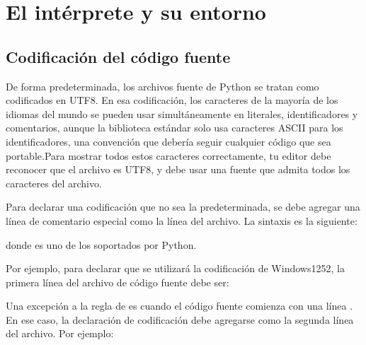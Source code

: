 \documentclass[a4,10pt,spanish]{sphinxmanual}
\begin{document}
\section{El intérprete y su entorno}
\label{\detokenize{tutorial/interpreter:the-interpreter-and-its-environment}}\label{\detokenize{tutorial/interpreter:tut-interp}}

\subsection{Codificación del código fuente}
\label{\detokenize{tutorial/interpreter:source-code-encoding}}\label{\detokenize{tutorial/interpreter:tut-source-encoding}}
\sphinxAtStartPar
De forma predeterminada, los archivos fuente de Python se tratan como codificados en UTF\sphinxhyphen{}8. En esa codificación, los caracteres de la mayoría de los idiomas del mundo se pueden usar simultáneamente en literales, identificadores y comentarios, aunque la biblioteca estándar solo usa caracteres ASCII para los identificadores, una convención que debería seguir cualquier código que sea portable.Para mostrar todos estos caracteres correctamente, tu editor debe reconocer que el archivo es UTF\sphinxhyphen{}8, y debe usar una fuente que admita todos los caracteres del archivo.

\sphinxAtStartPar
Para declarar una codificación que no sea la predeterminada, se debe agregar una línea de comentario especial como la  línea del archivo. La sintaxis es la siguiente:

\begin{sphinxVerbatim}[commandchars=\\\{\}]
\end{sphinxVerbatim}

\sphinxAtStartPar
donde  es uno de los  soportados por Python.

\sphinxAtStartPar
Por ejemplo, para declarar que se utilizará la codificación de Windows\sphinxhyphen{}1252, la primera línea del archivo de código fuente debe ser:

\begin{sphinxVerbatim}[commandchars=\\\{\}]
\end{sphinxVerbatim}

\sphinxAtStartPar
Una excepción a la regla de  es cuando el código fuente comienza con una línea {\hyperref[\detokenize{tutorial/appendix:tut-scripts}]{}}. En ese caso, la declaración de codificación debe agregarse como la segunda línea del archivo. Por ejemplo:
\end{document}
